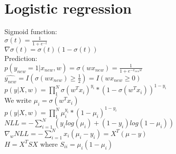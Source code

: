 \section{Logistic regression}
Sigmoid function:\\ $\sigma(t)=\frac{1}{1+e^{-t}}$\\ $\nabla\sigma(t)=\sigma(t)(1
-\sigma(t))$\\ Prediction:\\
$p(y_{new}=1|x_{new}, w)=\sigma(wx_{new})=\frac{1}{1+e^{-x_{new}w}}$\\ $\hat{y_{new}}
=I(\sigma(wx_{new}) \geq \frac{1}{2})=I(wx_{new}\geq0)$\\
$p(y|X,w)=\prod_{1}^{N}\sigma(w^{T}x_{i})^{y_i}*(1-\sigma(w^{T}x_{i}))^{1-y_i}$\\
We write $\mu_{i}= \sigma(w^{T}x_{i})$\\
$p(y|X,w)=\prod_{1}^{N}\mu_{i}^{y_i}*(1-\mu_{i})^{1-y_i}$\\ $NLL = -\sum_{i=1}^{N}
(y_{i}log(\mu_{i})+(1-y_{i})log(1-\mu_{i}))$\\
$\nabla_{w}NLL = -\sum_{i=1}^{N}x_{i}(\mu_{i}- y_{i}) = X^{T}(\mu - y)$\\ $H=X^{T}
SX$ where $S_{ii}= \mu_{i}(1-\mu_{i})$